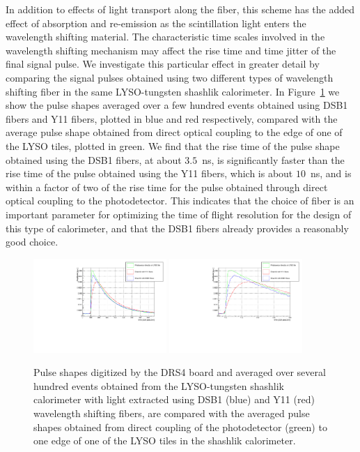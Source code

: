 \documentclass[11pt]{article}
\begin{document}
In addition to effects of light transport along the fiber, 
this scheme has the added effect of absorption and re-emission as 
the scintillation light enters the wavelength shifting material. 
The characteristic time scales involved in the wavelength shifting 
mechanism may affect the rise time and time jitter of the final signal 
pulse. We investigate this particular effect in greater detail by
comparing the signal pulses obtained using two different types
of wavelength shifting fiber in the same LYSO-tungsten shashlik
calorimeter. In Figure~\ref{fig:FiberPulseComparison} we show
the pulse shapes averaged over a few hundred events obtained 
using DSB1 fibers and Y11 fibers, plotted in blue and red respectively,
compared with the average pulse shape obtained from direct optical 
coupling to the edge of one of the LYSO tiles, plotted in green.
We find that the rise time of the pulse shape obtained using the 
DSB1 fibers, at about $3.5$~ns, is significantly faster than the rise time
of the pulse obtained using the Y11 fibers, which is about $10$~ns,
and is within a factor of two of the rise time for the pulse obtained 
through direct optical coupling to the photodetector. This indicates
that the choice of fiber is an important parameter for 
optimizing the time of flight resolution for the design of 
this type of calorimeter, and that the DSB1 fibers 
already provides a reasonably good choice.

\begin{figure}[h] \centering
\includegraphics[width=0.45\textwidth]{figs/FiberPulses} 
\includegraphics[width=0.45\textwidth]{figs/FiberPulsesZoom} 
\caption{ Pulse shapes digitized by the DRS4 board and averaged over several hundred events 
obtained from the LYSO-tungsten shashlik calorimeter with light extracted using
DSB1 (blue) and Y11 (red) wavelength shifting fibers, are compared with 
the averaged pulse shapes obtained from direct coupling of the photodetector (green)
to one edge of one of the LYSO tiles in the shashlik calorimeter.} 
\label{fig:FiberPulseComparison}
\end{figure}
\end{document}

